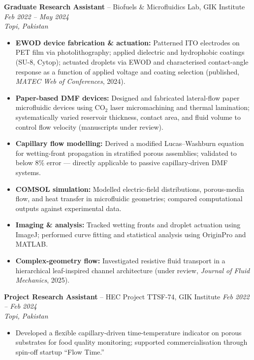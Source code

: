 \documentclass[11pt,a4paper]{article}
\begin{document}
\textbf{Graduate Research Assistant} -- Biofuels \& Microfluidics Lab, GIK
Institute \hfill \textit{Feb 2022 -- May 2024}\\
\textit{Topi, Pakistan}
\begin{itemize}
  \item \textbf{EWOD device fabrication \& actuation:} Patterned ITO electrodes
        on PET film via photolithography; applied dielectric and hydrophobic
        coatings (SU-8, Cytop); actuated droplets via EWOD and characterised
        contact-angle response as a function of applied voltage and coating
        selection (published, \textit{MATEC Web of Conferences}, 2024).
  \item \textbf{Paper-based DMF devices:} Designed and fabricated lateral-flow
        paper microfluidic devices using CO$_2$ laser micromachining and thermal
        lamination; systematically varied reservoir thickness, contact area, and
        fluid volume to control flow velocity (manuscripts under review).
  \item \textbf{Capillary flow modelling:} Derived a modified Lucas--Washburn
        equation for wetting-front propagation in stratified porous assemblies;
        validated to below 8\% error — directly applicable to passive
        capillary-driven DMF systems.
  \item \textbf{COMSOL simulation:} Modelled electric-field distributions,
        porous-media flow, and heat transfer in microfluidic geometries; compared
        computational outputs against experimental data.
  \item \textbf{Imaging \& analysis:} Tracked wetting fronts and droplet
        actuation using ImageJ; performed curve fitting and statistical analysis
        using OriginPro and MATLAB.
  \item \textbf{Complex-geometry flow:} Investigated resistive fluid transport
        in a hierarchical leaf-inspired channel architecture (under review,
        \textit{Journal of Fluid Mechanics}, 2025).
\end{itemize}

\vspace{4pt}
\textbf{Project Research Assistant} -- HEC Project TTSF-74, GIK Institute
\hfill \textit{Feb 2022 -- Feb 2024}\\
\textit{Topi, Pakistan}
\begin{itemize}
  \item Developed a flexible capillary-driven time-temperature indicator on
        porous substrates for food quality monitoring; supported commercialisation
        through spin-off startup ``Flow Time.''
\end{itemize}
\end{document}
